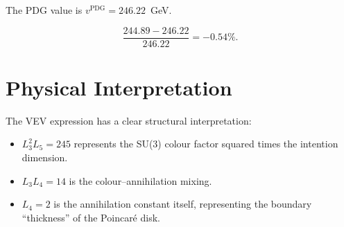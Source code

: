 The PDG value is \(v^{\text{PDG}} = 246.22\)~GeV.

\[
\frac{244.89 - 246.22}{246.22} = -0.54\%.
\]

\section{Physical Interpretation}

The VEV expression has a clear structural interpretation:
\begin{itemize}
\item \(L_3^2 L_5 = 245\) represents the SU(3) colour factor squared times
the intention dimension.
\item \(L_3 L_4 = 14\) is the colour--annihilation mixing.
\item \(L_4 = 2\) is the annihilation constant itself, representing the
boundary ``thickness'' of the Poincar\'{e} disk.
\end{itemize}
